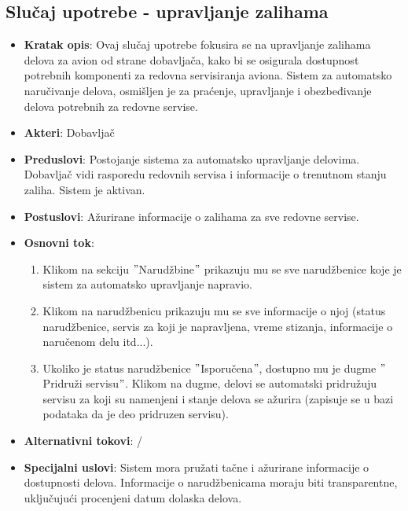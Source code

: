 \documentclass[a4paper]{article}
\begin{document}
\subsection{Slučaj upotrebe - upravljanje zalihama}
\label{subsec:redovan_servis}
\begin{itemize}
    \item \textbf{Kratak opis}: Ovaj slučaj upotrebe fokusira se na upravljanje zalihama delova za avion od strane dobavljača, kako bi se osigurala dostupnost potrebnih komponenti za redovna servisiranja aviona. Sistem za automatsko naručivanje delova, osmišljen je za praćenje, upravljanje i obezbeđivanje delova potrebnih za redovne servise.
    \item \textbf{Akteri}: Dobavljač
    \item \textbf{Preduslovi}: Postojanje sistema za automatsko upravljanje delovima. Dobavljač vidi rasporedu redovnih servisa i informacije o trenutnom stanju zaliha. Sistem je aktivan.
    \item \textbf{Postuslovi}: Ažurirane informacije o zalihama za sve redovne servise. 
    \item \textbf{Osnovni tok}:
        \begin{enumerate}
            \item Klikom na sekciju $"$Narudžbine$"$ prikazuju mu se sve narudžbenice koje je sistem za automatsko upravljanje napravio.
            \item Klikom na narudžbenicu prikazuju mu se sve informacije o njoj (status narudžbenice, servis za koji je napravljena, vreme stizanja, informacije o naručenom delu itd...).
            \item Ukoliko je status narudžbenice $"$Isporučena$"$, dostupno mu je dugme $"$Pridruži servisu$"$. Klikom na dugme, delovi se automatski pridružuju servisu za koji su namenjeni i stanje delova se ažurira (zapisuje se u bazi podataka da je deo pridruzen servisu).
        \end{enumerate}
    \item \textbf{Alternativni tokovi}: /
    \item \textbf{Specijalni uslovi}: Sistem mora pružati tačne i ažurirane informacije o dostupnosti delova. Informacije o narudžbenicama moraju biti transparentne, uključujući procenjeni datum dolaska delova.
\end{itemize}
\end{document}

